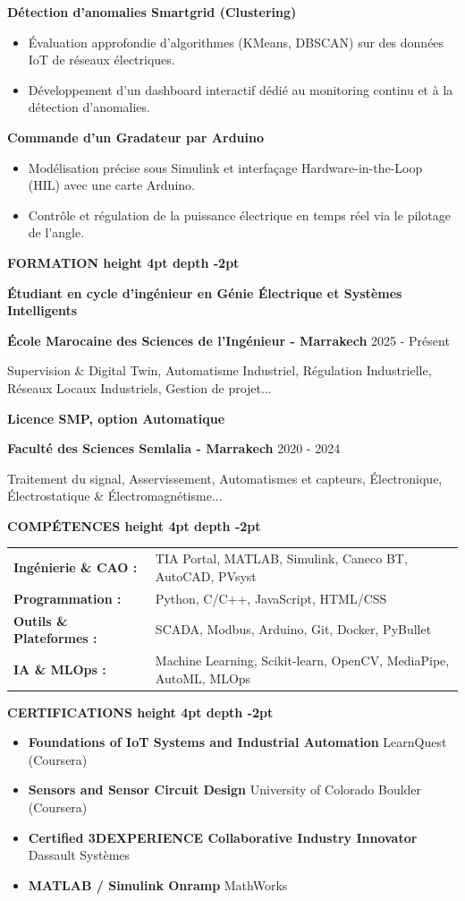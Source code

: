 \documentclass[10pt,a4paper]{altacv}
\renewcommand{\cvsection}[2][]{%
  \medskip%
  {\color{heading}\LARGE\bfseries #2 \hspace{0.2em}\leaders\vrule height 4pt depth -2pt\hfill\mbox{}}\par\smallskip
}
\renewcommand{\cvevent}[4]{%
  {\large\bfseries\color{accent}#1\par}
  \smallskip\normalsize
  \ifstrequal{#2}{}{}{%
    \textbf{\color{emphasis}#2\ifstrequal{#4}{}{}{ - #4}}%
  }%
  \hfill
  \ifstrequal{#3}{}{}{{\small#3}}%
  \par\smallskip
}
\begin{document}
{\large\bfseries\color{accent} Détection d'anomalies Smartgrid (Clustering)}\\[0.05cm]
\begin{itemize}
  \item Évaluation approfondie d'algorithmes (KMeans, DBSCAN) sur des données IoT de réseaux électriques.
  \item Développement d'un dashboard interactif dédié au monitoring continu et à la détection d'anomalies.
\end{itemize}

{\large\bfseries\color{accent} Commande d'un Gradateur par Arduino}\\[0.05cm]
\begin{itemize}
  \item Modélisation précise sous Simulink et interfaçage Hardware-in-the-Loop (HIL) avec une carte Arduino.
  \item Contrôle et régulation de la puissance électrique en temps réel via le pilotage de l'angle.
\end{itemize}


\cvsection{FORMATION}
\cvevent{Étudiant en cycle d'ingénieur en Génie Électrique et Systèmes Intelligents}{École Marocaine des Sciences de l'Ingénieur}{2025 - Présent}{Marrakech}
\small Supervision \& Digital Twin, Automatisme Industriel, Régulation Industrielle, Réseaux Locaux Industriels, Gestion de projet...

\cvevent{Licence SMP, option Automatique}{Faculté des Sciences Semlalia}{2020 - 2024}{Marrakech}
\small Traitement du signal, Asservissement, Automatismes et capteurs, Électronique, Électrostatique \& Électromagnétisme...

\cvsection{COMPÉTENCES}
\begin{tabular}{@{}ll@{}}
\textbf{Ingénierie \& CAO :} & TIA Portal, MATLAB, Simulink, Caneco BT, AutoCAD, PVsyst \\[1pt]
\textbf{Programmation :} & Python, C/C++, JavaScript, HTML/CSS \\[1pt]
\textbf{Outils \& Plateformes :} & SCADA, Modbus, Arduino, Git, Docker, PyBullet \\[1pt]
\textbf{IA \& MLOps :} & Machine Learning, Scikit-learn, OpenCV, MediaPipe, AutoML, MLOps \\
\end{tabular}

\cvsection{CERTIFICATIONS}
\begin{itemize}[leftmargin=*, label=\textbullet, itemsep=2pt]
  \item \textbf{Foundations of IoT Systems and Industrial Automation} \hfill {\color{emphasis}LearnQuest (Coursera)}
  \item \textbf{Sensors and Sensor Circuit Design} \hfill {\color{emphasis}University of Colorado Boulder (Coursera)}
  \item \textbf{Certified 3DEXPERIENCE Collaborative Industry Innovator} \hfill {\color{emphasis}Dassault Systèmes}
  \item \textbf{MATLAB / Simulink Onramp} \hfill {\color{emphasis}MathWorks}
\end{itemize}
\end{document}
